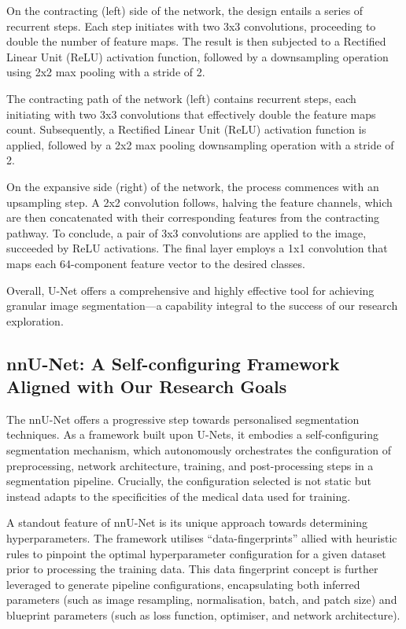 On the contracting (left) side of the network, the design entails a series of recurrent steps. Each step initiates with two 3x3 convolutions, proceeding to double the number of feature maps. The result is then subjected to a Rectified Linear Unit (ReLU) activation function, followed by a downsampling operation using 2x2 max pooling with a stride of 2.

The contracting path of the network (left) contains recurrent steps, each initiating with two 3x3 convolutions that effectively double the feature maps count. Subsequently, a Rectified Linear Unit (ReLU) activation function is applied, followed by a 2x2 max pooling downsampling operation with a stride of 2.

On the expansive side (right) of the network, the process commences with an upsampling step. A 2x2 convolution follows, halving the feature channels, which are then concatenated with their corresponding features from the contracting pathway. To conclude, a pair of 3x3 convolutions are applied to the image, succeeded by ReLU activations. The final layer employs a 1x1 convolution that maps each 64-component feature vector to the desired classes.

Overall, U-Net offers a comprehensive and highly effective tool for achieving granular image segmentation—a capability integral to the success of our research exploration.

\subsection{nnU-Net: A Self-configuring Framework Aligned with Our Research Goals}
The nnU-Net \cite{isensee2021nnu} offers a progressive step towards personalised segmentation techniques. As a framework built upon U-Nets, it embodies a self-configuring segmentation mechanism, which autonomously orchestrates the configuration of preprocessing, network architecture, training, and post-processing steps in a segmentation pipeline. Crucially, the configuration selected is not static but instead adapts to the specificities of the medical data used for training. 

A standout feature of nnU-Net is its unique approach towards determining hyperparameters. The framework utilises “data-fingerprints” allied with heuristic rules to pinpoint the optimal hyperparameter configuration for a given dataset prior to processing the training data. This data fingerprint concept is further leveraged to generate pipeline configurations, encapsulating both inferred parameters (such as image resampling, normalisation, batch, and patch size) and blueprint parameters (such as loss function, optimiser, and network architecture).

